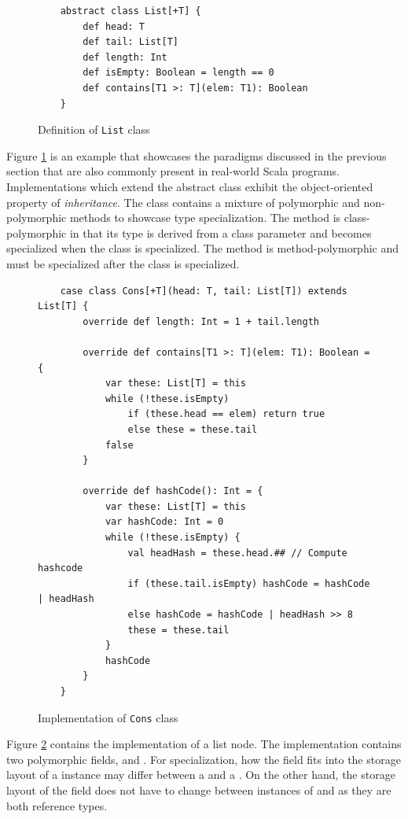 \begin{figure}[!htb]
	\begin{verbatim}
	abstract class List[+T] {
		def head: T
		def tail: List[T]
		def length: Int
		def isEmpty: Boolean = length == 0
		def contains[T1 >: T](elem: T1): Boolean
	}
	\end{verbatim}
	\caption{Definition of \texttt{List} class}
	\label{example:list-def}
\end{figure}

Figure \ref{example:list-def} is an example that showcases the paradigms discussed in the previous section that are also commonly present in real-world Scala programs.
Implementations which extend the abstract  class exhibit the object-oriented property of \textit{inheritance}.
The  class contains a mixture of polymorphic and non-polymorphic methods to showcase type specialization.
The  method is class-polymorphic in that its type is derived from a class parameter and becomes specialized when the class is specialized.
The  method is method-polymorphic and must be specialized after the class is specialized.

\begin{figure}[!htb]
	\begin{verbatim}
	case class Cons[+T](head: T, tail: List[T]) extends List[T] {
		override def length: Int = 1 + tail.length
		
		override def contains[T1 >: T](elem: T1): Boolean = {
			var these: List[T] = this
			while (!these.isEmpty) 
				if (these.head == elem) return true
				else these = these.tail
			false
		}
			
		override def hashCode(): Int = {
			var these: List[T] = this
			var hashCode: Int = 0
			while (!these.isEmpty) {
				val headHash = these.head.## // Compute hashcode
				if (these.tail.isEmpty) hashCode = hashCode | headHash
				else hashCode = hashCode | headHash >> 8
				these = these.tail
			}
			hashCode
		}
	}
	\end{verbatim}
	\caption{Implementation of \texttt{Cons} class}
	\label{example:cons-impl}
\end{figure}

Figure \ref{example:cons-impl} contains the implementation of a list node.
The  implementation contains two polymorphic fields,  and .
For specialization, how the  field fits into the storage layout of a  instance may differ between a  and a .
On the other hand, the storage layout of the  field does not have to change between instances of  and  as they are both reference types.

